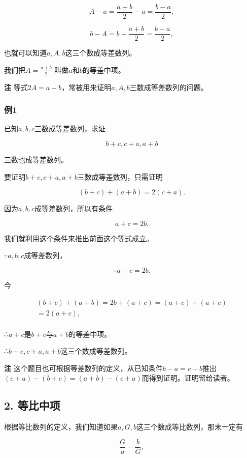 \[
A - a = \frac{a + b}{2} - a = \frac{b - a}{2},
\]

\[
b - A = b - \frac{a + b}{2} = \frac{b - a}{2},
\]

也就可以知道\(a, A, b\)这三个数成等差数列。

我们把\(A = \frac{a + b}{2}\) 叫做\(a\)和\(b\)的等差中项。

\textbf{注}
等式\(2A = a + b\)，常被用来证明\(a, A, b\)三数成等差数列的问题。

\subsubsection{例1}

已知\(a, b, c\)三数成等差数列，求证

\[
b + c, c + a, a + b
\]

三数也成等差数列。

 要证明\(b + c, c + a, a + b\)三数成等差数列，只需证明

\[
(b + c) + (a + b) = 2 (c + a).
\]

因为\(a, b, c\)成等差数列，所以有条件

\[
a + c = 2 b.
\]

我们就利用这个条件来推出前面这个等式成立。

 \(\because a, b, c\)成等差数列，

\[
\therefore a + c = 2 b.
\]

今

\[
\begin{array}{l} (b + c) + (a + b) = 2 b + (a + c) = (a + c) + (a + c) \\ = 2 (a + c), \\ \end{array}
\]

∴\(a+c\)是\(b+c\)与\(a+b\)的等差中项。

∴\(b+c, c+a, a+b\)这三个数成等差数列。

\textbf{注}
这个题目也可根据等差数列的定义，从已知条件\(b - a = c - b\)推出\((c + a) - (b + c) = (a + b) - (c + a)\)而得到证明。证明留给读者。

\subsection{2. 等比中项}

根据等比数列的定义，我们知道如果\(a, G, b\)这三个数成等比数列，那末一定有

\[
\frac{G}{a} - \frac{b}{G},
\]

